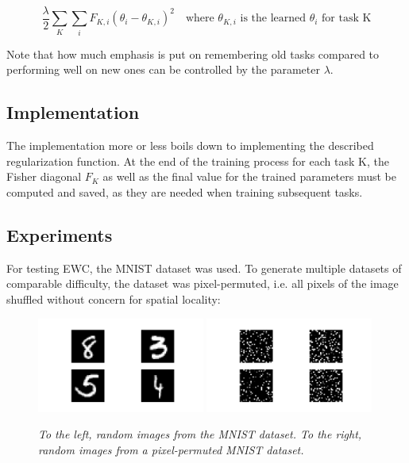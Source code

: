 \documentclass{article}
\begin{document}
        \begin{equation*}
            \frac{\lambda}{2}\sum_{K}{
                \sum_{i}{F_{K,i}(\theta_i - \theta_{K,i})^2}\quad
                \text{where $\theta_{K,i}$ is the learned $\theta_i$ for task K} 
            }
        \end{equation*}

        Note that how much emphasis is put on remembering old tasks compared to 
        performing well on new ones can be controlled by the parameter $\lambda$.
        
        \subsection*{Implementation}
        The implementation more or less boils down to implementing the described 
        regularization function. At the end of the training process for each task K, the Fisher diagonal 
        $F_K$ as well as the final value for the trained parameters must be computed
        and saved, as they are needed when training subsequent tasks. 
        
        \subsection*{Experiments}
        For testing EWC, the MNIST dataset was used. To generate 
        multiple datasets of comparable difficulty, the dataset was 
        pixel-permuted, i.e. all pixels of the image shuffled without concern
        for spatial locality: 

        \begin{figure}[H]
            \includegraphics[width=0.49\textwidth]{figures/regular_mnist.png}
            \includegraphics[width=0.49\textwidth]{figures/permuted_mnist.png}
            \caption{\textit{To the left, random images from the MNIST dataset. 
            To the right, random images from a pixel-permuted MNIST dataset.}}
        \end{figure}
\end{document}
